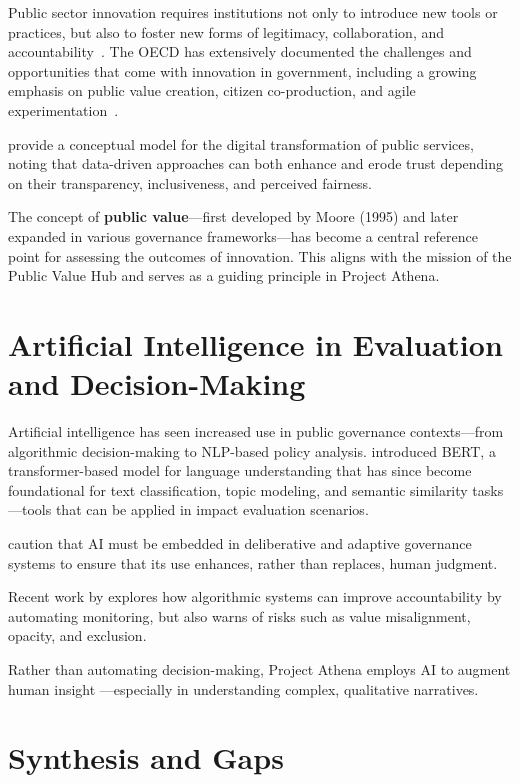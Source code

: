 Public sector innovation requires institutions not only to introduce new tools or practices, but also to foster new forms of legitimacy, collaboration, and accountability~\parencite{sun2019algorithmic}.
The OECD has extensively documented the challenges and opportunities that come with innovation in government, including a growing emphasis on public value creation, citizen co-production, and agile experimentation~\parencite{oecd2020publicsector}.

\textcite{wirtz2020public} provide a conceptual model for the digital transformation of public services, noting that data-driven approaches can both enhance and erode trust depending on their transparency, inclusiveness, and perceived fairness.

The concept of \textbf{public value}—first developed by Moore (1995) and later expanded in various governance frameworks—has become a central reference point for assessing the outcomes of innovation.
This aligns with the mission of the Public Value Hub and serves as a guiding principle in Project Athena.

\section{Artificial Intelligence in Evaluation and Decision-Making}\label{sec:artificial-intelligence-in-evaluation-and-decision-making}

Artificial intelligence has seen increased use in public governance contexts—from algorithmic decision-making to NLP-based policy analysis.
\textcite{devlin2018bert} introduced BERT, a transformer-based model for language understanding that has since become foundational for text classification, topic modeling, and semantic similarity tasks—tools that can be applied in impact evaluation scenarios.

\textcite{sun2019algorithmic} caution that AI must be embedded in deliberative and adaptive governance systems to ensure that its use enhances, rather than replaces, human judgment.

Recent work by \textcite{brown2020algorithmic} explores how algorithmic systems can improve accountability by automating monitoring, but also warns of risks such as value misalignment, opacity, and exclusion.


Rather than automating decision-making, Project Athena employs AI to augment human insight —especially in understanding complex, qualitative narratives.

\section{Synthesis and Gaps}\label{sec:synthesis-and-gaps}

